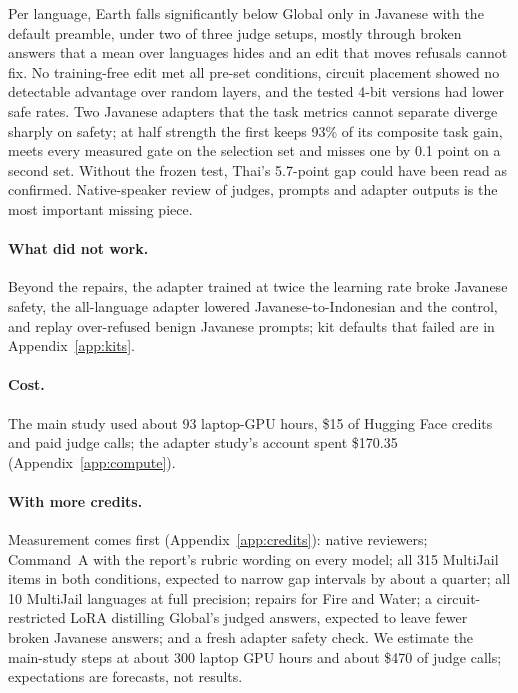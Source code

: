 \documentclass[11pt]{article}
\begin{document}
Per language, Earth falls significantly below Global only in Javanese with the default preamble, under two of three
judge setups, mostly through broken answers that a mean over languages hides and an edit that moves refusals cannot
fix. No training-free edit met all pre-set conditions, circuit placement showed no detectable advantage over random
layers, and the tested 4-bit versions had lower safe rates. Two Javanese adapters that the task metrics cannot
separate diverge sharply on safety; at half strength the first keeps 93\% of its composite task gain, meets every
measured gate on the selection set and misses one by 0.1 point on a second set. Without the frozen
test, Thai's 5.7-point gap could have been read as confirmed. Native-speaker review of judges, prompts and adapter outputs is the
most important missing piece.

\paragraph{What did not work.} Beyond the repairs, the adapter trained at twice the learning rate broke Javanese safety, the all-language adapter lowered Javanese-to-Indonesian and the control, and
replay over-refused benign Javanese prompts; kit defaults that failed are in Appendix~\ref{app:kits}.

\paragraph{Cost.} The main study used about 93 laptop-GPU hours, \$15 of Hugging Face credits and paid judge calls;
the adapter study's account spent \$170.35
(Appendix~\ref{app:compute}).

\paragraph{With more credits.} Measurement comes first (Appendix~\ref{app:credits}): native reviewers;
Command~A with the report's rubric wording on every model; all 315 MultiJail items in both conditions, expected to
narrow gap intervals by about a quarter; all 10 MultiJail languages at full
precision; repairs for Fire and Water; a circuit-restricted LoRA distilling Global's judged answers, expected to leave
fewer broken Javanese answers; and a fresh adapter safety check. We estimate the main-study steps at about 300 laptop
GPU hours and about \$470 of judge calls; expectations are forecasts, not results.\label{endmain}


\end{document}
